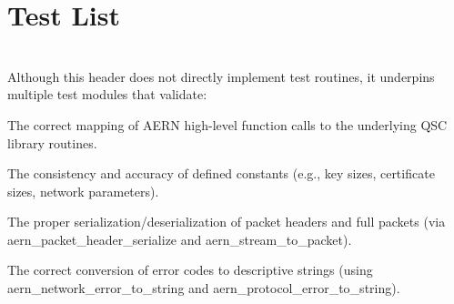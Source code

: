 \chapter{Test List }
\hypertarget{test}{}\label{test}

\begin{DoxyRefList}
\item[File \doxylink{aern_8h}{aern.h} ]\hfill \\
\label{test__test000001}%
%
 Although this header does not directly implement test routines, it underpins multiple test modules that validate\+:
\begin{DoxyItemize}
\item The correct mapping of AERN high-\/level function calls to the underlying QSC library routines.
\item The consistency and accuracy of defined constants (e.\+g., key sizes, certificate sizes, network parameters).
\item The proper serialization/deserialization of packet headers and full packets (via aern\+\_\+packet\+\_\+header\+\_\+serialize and aern\+\_\+stream\+\_\+to\+\_\+packet).
\item The correct conversion of error codes to descriptive strings (using aern\+\_\+network\+\_\+error\+\_\+to\+\_\+string and aern\+\_\+protocol\+\_\+error\+\_\+to\+\_\+string).
\end{DoxyItemize}
\end{DoxyRefList}